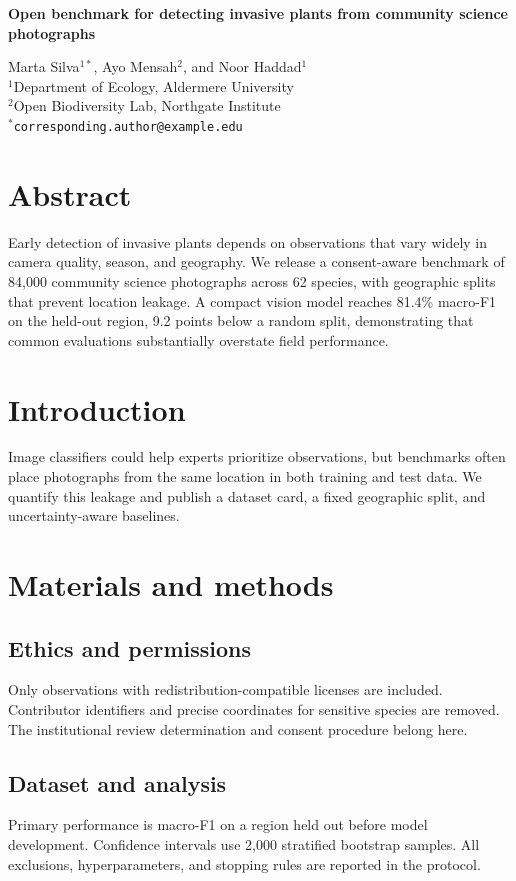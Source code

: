 \documentclass[12pt]{article}
\begin{document}
\begin{center}
{\LARGE\bfseries Open benchmark for detecting invasive plants from community
science photographs\par}
\vspace{0.7em}
Marta Silva$^{1*}$, Ayo Mensah$^2$, and Noor Haddad$^1$\\
$^1$Department of Ecology, Aldermere University\\
$^2$Open Biodiversity Lab, Northgate Institute\\
$^*$\texttt{corresponding.author@example.edu}
\end{center}

\section*{Abstract}
Early detection of invasive plants depends on observations that vary widely in
camera quality, season, and geography. We release a consent-aware benchmark of
84{,}000 community science photographs across 62 species, with geographic
splits that prevent location leakage. A compact vision model reaches 81.4\%
macro-F1 on the held-out region, 9.2 points below a random split, demonstrating
that common evaluations substantially overstate field performance.

\section{Introduction}
Image classifiers could help experts prioritize observations, but benchmarks
often place photographs from the same location in both training and test data.
We quantify this leakage and publish a dataset card, a fixed geographic split,
and uncertainty-aware baselines.

\section{Materials and methods}
\subsection{Ethics and permissions}
Only observations with redistribution-compatible licenses are included.
Contributor identifiers and precise coordinates for sensitive species are
removed. The institutional review determination and consent procedure belong
here.

\subsection{Dataset and analysis}
Primary performance is macro-F1 on a region held out before model development.
Confidence intervals use 2{,}000 stratified bootstrap samples. All exclusions,
hyperparameters, and stopping rules are reported in the protocol.
\end{document}
